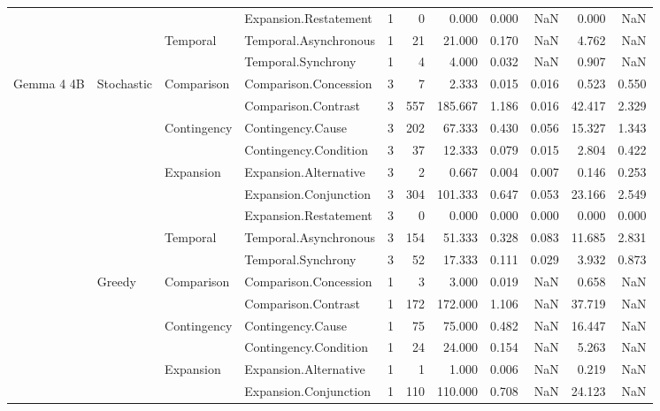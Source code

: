 \begin{table}
\begin{tabular}{llllrrrrrrr}
 &  &  & Expansion.Restatement & 1 & 0 & 0.000 & 0.000 & NaN & 0.000 & NaN \\
\cline{3-11}
 &  & \multirow[t]{2}{*}{Temporal} & Temporal.Asynchronous & 1 & 21 & 21.000 & 0.170 & NaN & 4.762 & NaN \\
 &  &  & Temporal.Synchrony & 1 & 4 & 4.000 & 0.032 & NaN & 0.907 & NaN \\
\cline{1-11} \cline{2-11} \cline{3-11}
\multirow[t]{18}{*}{Gemma 4 4B} & \multirow[t]{9}{*}{Stochastic} & \multirow[t]{2}{*}{Comparison} & Comparison.Concession & 3 & 7 & 2.333 & 0.015 & 0.016 & 0.523 & 0.550 \\
 &  &  & Comparison.Contrast & 3 & 557 & 185.667 & 1.186 & 0.016 & 42.417 & 2.329 \\
\cline{3-11}
 &  & \multirow[t]{2}{*}{Contingency} & Contingency.Cause & 3 & 202 & 67.333 & 0.430 & 0.056 & 15.327 & 1.343 \\
 &  &  & Contingency.Condition & 3 & 37 & 12.333 & 0.079 & 0.015 & 2.804 & 0.422 \\
\cline{3-11}
 &  & \multirow[t]{3}{*}{Expansion} & Expansion.Alternative & 3 & 2 & 0.667 & 0.004 & 0.007 & 0.146 & 0.253 \\
 &  &  & Expansion.Conjunction & 3 & 304 & 101.333 & 0.647 & 0.053 & 23.166 & 2.549 \\
 &  &  & Expansion.Restatement & 3 & 0 & 0.000 & 0.000 & 0.000 & 0.000 & 0.000 \\
\cline{3-11}
 &  & \multirow[t]{2}{*}{Temporal} & Temporal.Asynchronous & 3 & 154 & 51.333 & 0.328 & 0.083 & 11.685 & 2.831 \\
 &  &  & Temporal.Synchrony & 3 & 52 & 17.333 & 0.111 & 0.029 & 3.932 & 0.873 \\
\cline{2-11} \cline{3-11}
 & \multirow[t]{9}{*}{Greedy} & \multirow[t]{2}{*}{Comparison} & Comparison.Concession & 1 & 3 & 3.000 & 0.019 & NaN & 0.658 & NaN \\
 &  &  & Comparison.Contrast & 1 & 172 & 172.000 & 1.106 & NaN & 37.719 & NaN \\
\cline{3-11}
 &  & \multirow[t]{2}{*}{Contingency} & Contingency.Cause & 1 & 75 & 75.000 & 0.482 & NaN & 16.447 & NaN \\
 &  &  & Contingency.Condition & 1 & 24 & 24.000 & 0.154 & NaN & 5.263 & NaN \\
\cline{3-11}
 &  & \multirow[t]{3}{*}{Expansion} & Expansion.Alternative & 1 & 1 & 1.000 & 0.006 & NaN & 0.219 & NaN \\
 &  &  & Expansion.Conjunction & 1 & 110 & 110.000 & 0.708 & NaN & 24.123 & NaN \\

\end{tabular}
\end{table}

